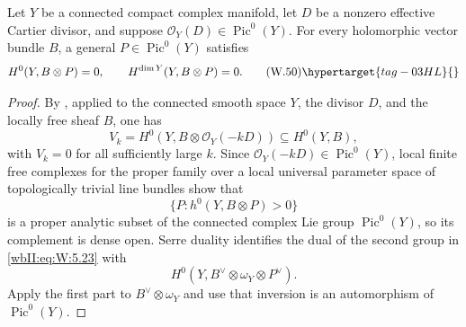 \begin{lemma}\hypertarget{tag-03I7}{}\label{wbII:lem:cdp-generic-endpoints}

Let \(Y\) be a connected compact complex manifold, let \(D\) be
a nonzero effective Cartier divisor, and suppose
\(\mathcal O_Y(D)\in\operatorname{Pic}^0(Y)\).  For every holomorphic vector
bundle \(B\), a general \(P\in\operatorname{Pic}^0(Y)\) satisfies
\[
 H^0(Y,B\otimes P)=0,\qquad
 H^{\dim Y}(Y,B\otimes P)=0.
\tag{W.50}\hypertarget{tag-03HL}{}\label{wbII:eq:W:5.23}
\]
\end{lemma}



\begin{proof}
By \cite[Proposition~1.1, p.~78]{CDP98}, applied to the connected smooth
space \(Y\), the divisor \(D\), and the locally free sheaf \(B\), one has
\[
 V_k=H^0(Y,B\otimes\mathcal O_Y(-kD))
 \subseteq H^0(Y,B),
\]
with \(V_k=0\) for all sufficiently large \(k\).
Since
\(\mathcal O_Y(-kD)\in\operatorname{Pic}^0(Y)\), local finite free complexes for the proper family over a
local universal parameter space of topologically trivial line bundles
\cite[Chapter~III, \S4, Theorem~4.1, p.~124]{BS76push} show that
\[
 \{P:h^0(Y,B\otimes P)>0\}
\]
is a proper analytic subset of the connected complex Lie group
\(\operatorname{Pic}^0(Y)\), so its complement is dense open.
Serre duality identifies the dual
of the second group in \eqref{wbII:eq:W:5.23} with
\[
 H^0(Y,B^\vee\otimes\omega_Y\otimes P^\vee).
\]
Apply the first part to \(B^\vee\otimes\omega_Y\) and use that inversion is
an automorphism of \(\operatorname{Pic}^0(Y)\).

\end{proof}